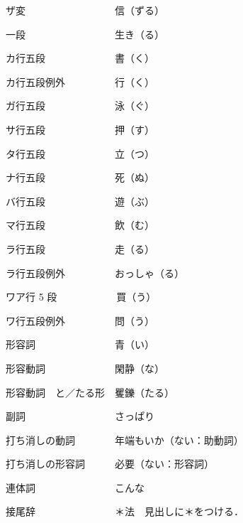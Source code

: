 \documentclass[japanese]{jnlp_1.4}
\begin{document}
ザ変　　　　　　　　　信（ずる）

一段　　　　　　　　　生き（る）

カ行五段　　　　　　　書（く）

カ行五段例外　　　　　行（く）

ガ行五段　　　　　　　泳（ぐ）

サ行五段　　　　　　　押（す）

タ行五段　　　　　　　立（つ）

ナ行五段　　　　　　　死（ぬ）

バ行五段　　　　　　　遊（ぶ）

マ行五段　　　　　　　飲（む）

ラ行五段　　　　　　　走（る）

ラ行五段例外　　　　　おっしゃ（る）

ワア行 5 段　　　　　　買（う）

ワ行五段例外　　　　　問（う）

形容詞　　　　　　　　青（い）

形容動詞　　　　　　　閑静（な）

形容動詞　と／たる形　矍鑠（たる）

副詞　　　　　　　　　さっぱり

打ち消しの動詞　　　　年端もいか（ない：助動詞）

打ち消しの形容詞　　　必要（ない：形容詞）

連体詞　　　　　　　　こんな

接尾辞　　　　　　　　＊法　見出しに＊をつける．


\begin{biography}

\end{biography}

\biodate
\end{document}
